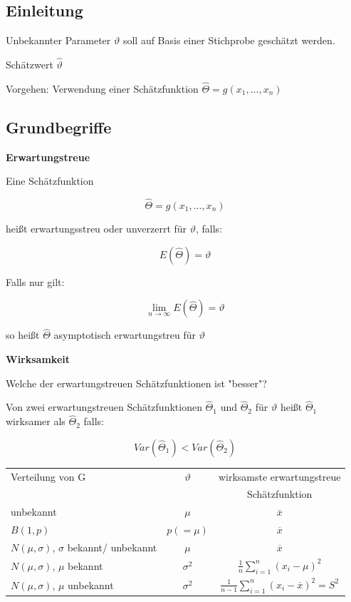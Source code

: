 \documentclass[a4paper]{article}
\title{\docTitle}
\author{Moritz}
\date{\today}
\begin{document}
\maketitle
\tableofcontents


\subsection{Einleitung}

Unbekannter Parameter $\vartheta$ soll auf Basis einer Stichprobe geschätzt werden.

Schätzwert $\hat{\vartheta}$

Vorgehen: Verwendung einer Schätzfunktion $\hat{\Theta} = g(x_1, ..., x_n)$

\subsection{Grundbegriffe}

\textbf{Erwartungstreue}

Eine Schätzfunktion

\[
\hat{\Theta} = g(x_1, ..., x_n)
\]

heißt erwartungsstreu oder unverzerrt für $\vartheta$, falls:

\[
E(\hat{\Theta}) = \vartheta
\]

Falls nur gilt:

\[
\lim_{n\to\infty} E(\hat{\Theta}) = \vartheta
\]

so heißt $\hat{\Theta}$ asymptotisch erwartungstreu für $\vartheta$


\textbf{Wirksamkeit}

Welche der erwartungstreuen Schätzfunktionen ist "besser"?

Von zwei erwartungstreuen Schätzfunktionen $\hat{\Theta}_1$ und $\hat{\Theta}_2$ für $\vartheta$ heißt $\hat{\Theta}_1$ wirksamer als $\hat{\Theta}_2$ falls:

\[
Var(\hat{\Theta}_1) < Var(\hat{\Theta}_2)
\]


\begin{center}
    \begin{tabular}{lc|c}
        Verteilung von G & $\vartheta$ & wirksamste erwartungstreue \\
        & & Schätzfunktion \\
        \hline
        unbekannt & $\mu$ & $\overline{x}$\\
        $B(1, p)$ & $p(=\mu)$ & $\overline{x}$\\
        $N(\mu, \sigma)$, $\sigma$ bekannt/ unbekannt & $\mu$ & $\overline{x}$\\
        $N(\mu, \sigma)$, $\mu$ bekannt & $\sigma^2$ & $\frac{1}{n}\sum_{i=1}^{n}(x_i - \mu)^2$\\
        $N(\mu, \sigma)$, $\mu$ unbekannt & $\sigma^2$ & $\frac{1}{n-1}\sum_{i=1}^{n}(x_i - \overline{x})^2 = S^2$\\
    \end{tabular}
\end{center}
\end{document}
